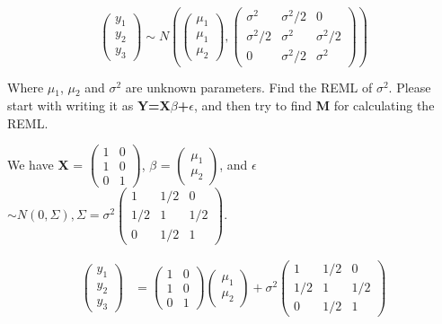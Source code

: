 \documentclass[11pt]{article}
\begin{document}
$$\begin{pmatrix} y_1 \\ y_2 \\ y_3 \end{pmatrix} \sim N 
\left(\begin{pmatrix} \mu_1 \\ \mu_1 \\ \mu_2 \end{pmatrix},
\begin{pmatrix} \sigma^2 & \sigma^2/2 & 0 \\ \sigma^2/2
& \sigma^2 & \sigma^2/2 \\ 0 & \sigma^2/2 & \sigma^2 \end{pmatrix}
\right)$$ 

Where $\mu$$_1$, $\mu$$_2$ and $\sigma$$^2$ are unknown parameters. 
Find the REML of $\sigma$$^2$. Please start with writing it as \textbf{Y=X$\beta$+$\epsilon$}, and then try to find \textbf{M} for calculating the REML.
 
We have \textbf{X} = $\begin{pmatrix} 1 & 0 \\ 1 & 0 \\ 0 & 1 \end{pmatrix}$, 
\textbf{$\beta$} = $\begin{pmatrix} \mu_1 \\ \mu_2 \end{pmatrix}$, and 
\textbf{$\epsilon$} $\sim N(0,\Sigma),\Sigma=\sigma^2
\begin{pmatrix} 1 & 1/2 & 0 \\ 1/2 & 1 & 1/2 \\ 0 & 1/2 & 1 \end{pmatrix}$.

\begin{align*}
\begin{pmatrix} y_1 \\ y_2 \\ y_3 \end{pmatrix} &= 
\begin{pmatrix} 1 & 0 \\ 1 & 0 \\ 0 & 1 \end{pmatrix} 
\begin{pmatrix} \mu_1 \\ \mu_2 \end{pmatrix} + \sigma^2 
\begin{pmatrix} 1 & 1/2 & 0 \\ 1/2 & 1 & 1/2 \\ 0 & 1/2 & 1 \end{pmatrix}
\end{align*}
\end{document}
